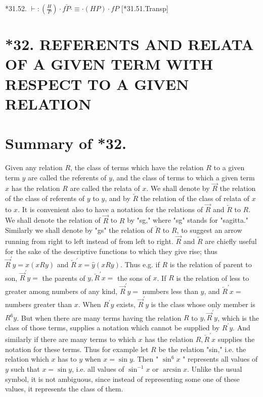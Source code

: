 \documentclass[10pt]{article}
\begin{document}
*31.52. $\vdash:\left(\frac{H}{P}\right) \cdot f \breve{P} \cdot \equiv \cdot(H P) \cdot f P$ [*31.51.Transp]

\section*{*32. REFERENTS AND RELATA OF A GIVEN TERM WITH RESPECT TO A GIVEN RELATION}
\section*{Summary of *32.}
Given any relation $R$, the class of terms which have the relation $R$ to a given term $y$ are called the referents of $y$, and the class of terms to which a given term $x$ has the relation $R$ are called the relata of $x$. We shall denote by $\vec{R}$ the relation of the class of referents of $y$ to $y$, and by $\overleftarrow{R}$ the relation of the class of relata of $x$ to $x$. It is convenient also to have a notation for the relations of $\vec{R}$ and $\overleftarrow{R}$ to $R$. We shall denote the relation of $\vec{R}$ to $R$ by "sg," where "sg" stands for "sagitta." Similarly we shall denote by "gs" the relation of $\overleftarrow{R}$ to $R$, to suggest an arrow running from right to left instead of from left to right. $\vec{R}$ and $\overleftarrow{R}$ are chiefly useful for the sake of the descriptive functions to which they give rise; thus $\vec{R}^{\prime} y=\hat{x}(x R y)$ and $\overleftarrow{R}^{\prime} x=\hat{y}(x R y)$. Thus e.g. if $R$ is the relation of parent to son, $\vec{R}^{\prime} y=$ the parents of $y, \overleftarrow{R}^{\prime} x=$ the sons of $x$. If $R$ is the relation of less to greater among numbers of any kind, $\vec{R}^{\prime} y=$ numbers less than $y$, and $\overleftarrow{R}^{\prime} x=$ numbers greater than $x$. When $R^{\prime} y$ exists, $\vec{R}^{\prime} y$ is the class whose only member is $R^{6} y$. But when there are many terms having the relation $R$ to $y, \vec{R}^{\prime} y$, which is the class of those terms, supplies a notation which cannot be supplied by $R^{\prime} y$. And similarly if there are many terms to which $x$ has the relation $R, \overleftarrow{R}^{\prime} x$ supplies the notation for these terms. Thus for example let $R$ be the relation "sin," i.e. the relation which $x$ has to $y$ when $x=\sin y$. Then " $\sin ^{6} x$ " represents all values of $y$ such that $x=\sin y$, i.e. all values of $\sin ^{-1} x$ or $\arcsin x$. Unlike the usual symbol, it is not ambiguous, since instead of representing some one of these values, it represents the class of them.
\end{document}
